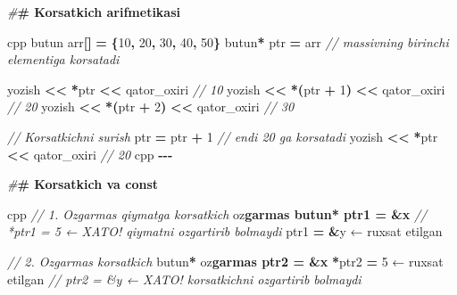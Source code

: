 \documentclass[a4paper,11pt,twoside,openright]{book}
\newenvironment{Shaded}{\begin{snugshade}}{\end{snugshade}}
\newcommand{\CharTok}[1]{\textcolor[rgb]{0.31,0.60,0.02}{#1}}
\newcommand{\CommentTok}[1]{\textcolor[rgb]{0.56,0.35,0.01}{\textit{#1}}}
\newcommand{\DecValTok}[1]{\textcolor[rgb]{0.00,0.00,0.81}{#1}}
\newcommand{\ErrorTok}[1]{\textcolor[rgb]{0.64,0.00,0.00}{\textbf{#1}}}
\newcommand{\NormalTok}[1]{#1}
\newcommand{\OperatorTok}[1]{\textcolor[rgb]{0.81,0.36,0.00}{\textbf{#1}}}
\newcommand{\PreprocessorTok}[1]{\textcolor[rgb]{0.56,0.35,0.01}{\textit{#1}}}
\begin{document}
\begin{Shaded}
\begin{Highlighting}[]
\PreprocessorTok{\#}\ErrorTok{\# Ko\textquotesingle{}rsatkich arifmetikasi}

\ErrorTok{\textasciigrave{}\textasciigrave{}\textasciigrave{}}\NormalTok{cpp}
\NormalTok{butun arr}\OperatorTok{[]} \OperatorTok{=} \OperatorTok{\{}\DecValTok{10}\OperatorTok{,} \DecValTok{20}\OperatorTok{,} \DecValTok{30}\OperatorTok{,} \DecValTok{40}\OperatorTok{,} \DecValTok{50}\OperatorTok{\}}
\NormalTok{butun}\OperatorTok{*}\NormalTok{ ptr }\OperatorTok{=}\NormalTok{ arr     }\CommentTok{// massivning birinchi elementiga ko\textquotesingle{}rsatadi}

\NormalTok{yozish }\OperatorTok{\textless{}\textless{}} \OperatorTok{*}\NormalTok{ptr }\OperatorTok{\textless{}\textless{}}\NormalTok{ qator\_oxiri         }\CommentTok{// 10}
\NormalTok{yozish }\OperatorTok{\textless{}\textless{}} \OperatorTok{*(}\NormalTok{ptr }\OperatorTok{+} \DecValTok{1}\OperatorTok{)} \OperatorTok{\textless{}\textless{}}\NormalTok{ qator\_oxiri   }\CommentTok{// 20}
\NormalTok{yozish }\OperatorTok{\textless{}\textless{}} \OperatorTok{*(}\NormalTok{ptr }\OperatorTok{+} \DecValTok{2}\OperatorTok{)} \OperatorTok{\textless{}\textless{}}\NormalTok{ qator\_oxiri   }\CommentTok{// 30}

\CommentTok{// Ko\textquotesingle{}rsatkichni surish}
\NormalTok{ptr }\OperatorTok{=}\NormalTok{ ptr }\OperatorTok{+} \DecValTok{1}       \CommentTok{// endi 20 ga ko\textquotesingle{}rsatadi}
\NormalTok{yozish }\OperatorTok{\textless{}\textless{}} \OperatorTok{*}\NormalTok{ptr }\OperatorTok{\textless{}\textless{}}\NormalTok{ qator\_oxiri         }\CommentTok{// 20}
\ErrorTok{\textasciigrave{}\textasciigrave{}\textasciigrave{}}\NormalTok{cpp}
\OperatorTok{{-}{-}{-}}

\PreprocessorTok{\#}\ErrorTok{\# Ko\textquotesingle{}rsatkich va \textasciigrave{}const\textasciigrave{}}

\ErrorTok{\textasciigrave{}\textasciigrave{}\textasciigrave{}}\NormalTok{cpp}
\CommentTok{// 1. O\textquotesingle{}zgarmas qiymatga ko\textquotesingle{}rsatkich}
\NormalTok{o}\CharTok{\textquotesingle{}z}\ErrorTok{garmas butun* ptr1 = \&x}
\CommentTok{// *ptr1 = 5    ← XATO! qiymatni o\textquotesingle{}zgartirib bo\textquotesingle{}lmaydi}
\NormalTok{ptr1 }\OperatorTok{=} \OperatorTok{\&}\NormalTok{y       ← ruxsat etilgan}

\CommentTok{// 2. O\textquotesingle{}zgarmas ko\textquotesingle{}rsatkich}
\NormalTok{butun}\OperatorTok{*}\NormalTok{ o}\CharTok{\textquotesingle{}z}\ErrorTok{garmas ptr2 = \&x}
\OperatorTok{*}\NormalTok{ptr2 }\OperatorTok{=} \DecValTok{5}\NormalTok{       ← ruxsat etilgan}
\CommentTok{// ptr2 = \&y    ← XATO! ko\textquotesingle{}rsatkichni o\textquotesingle{}zgartirib bo\textquotesingle{}lmaydi}


\end{Highlighting}
\end{Shaded}
\end{document}
